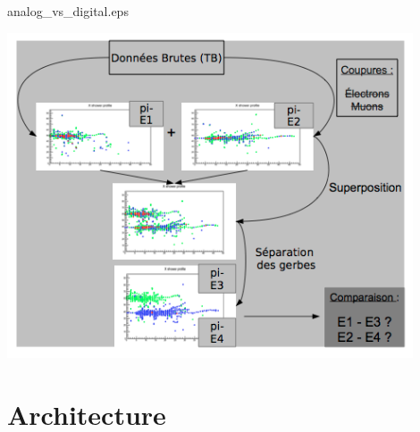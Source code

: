 \begin{frame}{analog\_vs\_digital.eps}
  \centerline{\includegraphics[width=0.9\textwidth]{images/Beam2012Arbor}}
\end{frame}



\section{Architecture}

